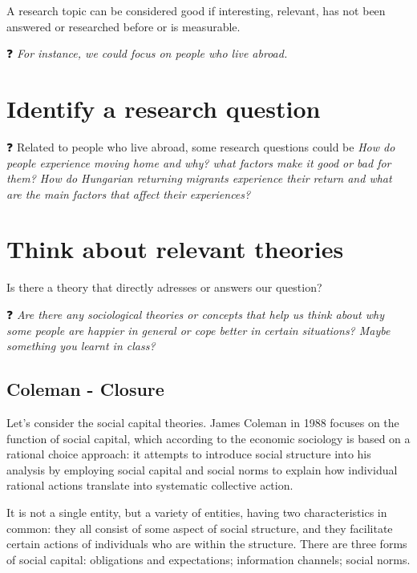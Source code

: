 \documentclass[
  notitlepage,
  onecolumn,
  openany]{book}
\begin{document}
A research topic can be considered good if interesting, relevant, has not been answered or researched before or is measurable.

❓ \emph{For instance, we could focus on people who live abroad.}

\hypertarget{identify-a-research-question}{%
\section{Identify a research question}\label{identify-a-research-question}}

❓ Related to people who live abroad, some research questions could be \emph{How do people experience moving home and why? what factors make it good or bad for them? How do Hungarian returning migrants experience their return and what are the
main factors that affect their experiences?}

\hypertarget{think-about-relevant-theories}{%
\section{Think about relevant theories}\label{think-about-relevant-theories}}

Is there a theory that directly adresses or answers our question?

❓ \emph{Are there any sociological theories or concepts that help us think about why some people are happier in general or cope better in certain situations? Maybe something you learnt in class?}

\hypertarget{coleman---closure}{%
\subsection{Coleman - Closure}\label{coleman---closure}}

Let's consider the social capital theories. James Coleman in 1988 focuses on the function of social capital, which according to the economic sociology is based on a rational choice approach: it attempts to introduce social structure into his analysis by employing social capital and social norms to explain how individual rational actions translate into systematic collective action.

It is not a single entity, but a variety of entities, having two characteristics in common: they all consist of some aspect of social structure, and they facilitate certain actions of individuals who are within the structure. There are three forms of social capital: obligations and expectations; information channels; social norms.
\end{document}

